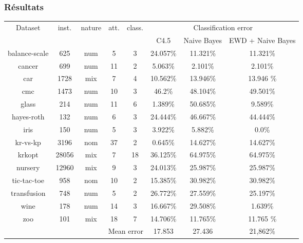 \begin{frame}
 \frametitle{Résultats}
\begin{center}
\begin{footnotesize}
 
\begin{agrandirmarges}{1cm}{2cm}
 
 
\begin{tabular}{|c|c|c|c|c|c|c|c|}
\hline
Dataset & inst. & nature & att. & class. & \multicolumn{3}{c|}{ Classification error } \\
\cline{6-8}
& & & & & C4.5 & Naive Bayes & EWD + Naive Bayes \\
\hline
balance-scale&625&num&5&3&24.057\%&11.321\% & 11.321\% \\
\hline
cancer&699&num&11&2&5.063\%&2.101\% & 2.101\% \\
\hline
car&1728&mix&7&4&10.562\%&13.946\% & 13.946 \% \\
\hline
cmc&1473&num&10&3&46.2\%&48.104\% &  49.501\% \\
\hline
glass&214&num&11&6&1.389\%&50.685\% &  9.589\% \\
\hline
hayes-roth&132&num&6&3&24.444\%&46.667\% &  44.444\% \\
\hline
iris&150&num&5&3&3.922\%&5.882\% &  0.0\% \\
\hline
kr-vs-kp&3196&nom&37&2&0.645\%&14.627\% &  14.627\% \\
\hline
krkopt&28056&mix&7&18&36.125\%&64.975\% &  64.975\% \\
\hline
nursery&12960&mix&9&3&24.013\%&25.987\% &  25.987\% \\
\hline
tic-tac-toe&958&nom&10&2&15.385\%&30.982\% &  30.982\% \\
\hline
transfusion&748&num&5&2&26.772\%&27.559\% &  25.197\% \\
\hline
wine&178&num&14&3&16.667\%&29.508\% &  1.639\% \\
\hline
zoo&101&mix&18&7&14.706\%&11.765\% & 11.765 \% \\
\hline
\multicolumn{5}{|r|}{ Mean error } & 17.853 & 27.436 & 21,862\% \\
\hline
\end{tabular}

\end{agrandirmarges}
\end{footnotesize}

\end{center}

\end{frame}
 